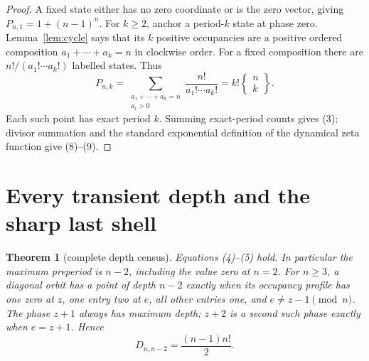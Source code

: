 \documentclass[a4paper,10pt]{amsart}
\newtheorem{theorem}{Theorem}
\theoremstyle{remark}
\begin{document}
\begin{proof}
A fixed state either has no zero coordinate or is the zero vector, giving
$P_{n,1}=1+(n-1)^n$.  For $k\geq2$, anchor a period-$k$ state at phase
zero.  Lemma~\ref{lem:cycle} says that its $k$ positive occupancies are a
positive ordered composition $a_1+\cdots+a_k=n$ in clockwise order.
For a fixed composition there are $n!/(a_1!\cdots a_k!)$ labelled states.
Thus
\[
 P_{n,k}=\sum_{\substack{a_1+\cdots+a_k=n\\a_i>0}}
 \frac{n!}{a_1!\cdots a_k!}
 =k!\left\{\begin{matrix}n\\k\end{matrix}\right\}.
\]
Each such point has exact period $k$.  Summing exact-period counts gives
(3); divisor summation and the standard exponential definition of the
dynamical zeta function give (8)--(9).
\end{proof}

\section{Every transient depth and the sharp last shell}

\begin{theorem}[complete depth census]\label{thm:depth}
Equations (4)--(5) hold.  In particular the maximum preperiod is $n-2$,
including the value zero at $n=2$.  For $n\geq3$, a diagonal orbit has a
point of depth $n-2$ exactly when its occupancy profile has one zero at
$z$, one entry two at $e$, all other entries one, and
$e\ne z-1\pmod n$.  The phase $z+1$ always has maximum depth; $z+2$ is a
second such phase exactly when $e=z+1$.  Hence
\begin{equation}
 D_{n,n-2}=\frac{(n-1)n!}{2}.
\end{equation}
\end{theorem}
\end{document}
